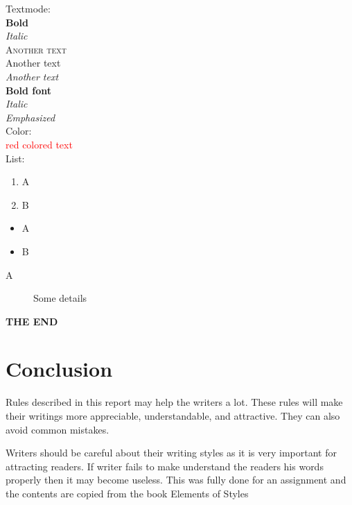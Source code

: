 \documentclass[10pt]{report}
\begin{document}
\noindent
{\Large Textmode:}\\
\textbf{Bold}\\
\textit{Italic}\\
\textsc{Another text}\\
\textsf{Another text}\\
\emph{Another text}\\
{\bfseries Bold font}\\
{\itshape Italic }\\
{\em Emphasized}\\

\noindent
{\Large Color:}\\
\textcolor{red}{red colored text}\\




\noindent
{\Large List:}\\
\begin{enumerate} %
 \item A
 \item B
 \end{enumerate}

 \begin{itemize} %
 \item A
 \item B
 \end{itemize}

 \begin{description} %
 \item[A] Some details
 \end{description}
 
 
 \center
{ \bfseries THE END}


\chapter {Conclusion}

\noindent
Rules described in this report may help the writers a lot.
These rules will make their writings
more appreciable, understandable, and attractive. They can also avoid common mistakes.



Writers should be careful about their writing styles as it is very important for
attracting readers.
If writer fails to make understand the readers his words
properly then it may become useless. 
This was fully done for an assignment and the contents are copied from the
book Elements of Styles
\end{document}
